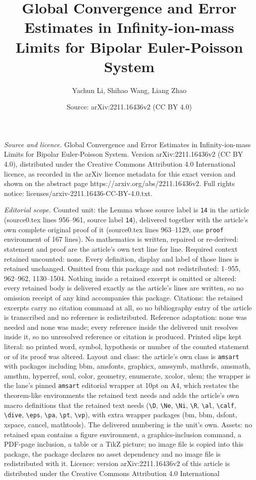 \documentclass[10pt,a4paper]{amsart}
\title[Global Convergence and Error Estimates in Infinity-ion-mass ]{Global Convergence and Error Estimates in Infinity-ion-mass Limits for Bipolar Euler-Poisson System}
\author{Yachun Li, Shihao Wang, Liang Zhao}
\date{Source: arXiv:2211.16436v2 (CC BY 4.0)}
\begin{document}
\maketitle

\noindent\emph{Source and licence.} Global Convergence and Error Estimates in Infinity-ion-mass Limits for Bipolar Euler-Poisson System. Version arXiv:2211.16436v2 (CC BY 4.0), distributed under the Creative Commons Attribution 4.0 International licence, as recorded in the arXiv licence metadata for this exact version and shown on the abstract page https://arxiv.org/abs/2211.16436v2. Full rights notice: licenses/arxiv-2211.16436-CC-BY-4.0.txt.\par\smallskip

\noindent\textit{Editorial scope.} Counted unit: the Lemma whose source label is \texttt{14} in the article (source0.tex lines 956--961, source label \texttt{14}), delivered together with the article's own complete original proof of it (source0.tex lines 963--1129, one \texttt{proof} environment of 167 lines). No mathematics is written, repaired or re-derived: statement and proof are the article's own text line for line. Required context retained uncounted: none. Every definition, display and label of those lines is retained unchanged. Omitted from this package and not redistributed: 1--955, 962--962, 1130--1504. Nothing inside a retained excerpt is omitted or altered: every retained body is delivered exactly as the article's lines are written, so no omission receipt of any kind accompanies this package. Citations: the retained excerpts carry no citation command at all, so no bibliography entry of the article is transcribed and no reference is redistributed. Reference adaptation: none was needed and none was made; every reference inside the delivered unit resolves inside it, so no unresolved reference or citation is produced. Printed slips kept literal: no printed word, symbol, hypothesis or number of the counted statement or of its proof was altered. Layout and class: the article's own class is \texttt{amsart} with packages including bbm, amsfonts, graphicx, amssymb, mathrsfs, amsmath, amsthm, hyperref, soul, color, geometry, enumerate, xcolor, ulem; the wrapper is the lane's pinned \texttt{amsart} editorial wrapper at 10pt on A4, which restates the theorem-like environments the retained text needs and adds the article's own macro definitions that the retained text needs (\texttt{\textbackslash D}, \texttt{\textbackslash Ne}, \texttt{\textbackslash Ni}, \texttt{\textbackslash R}, \texttt{\textbackslash al}, \texttt{\textbackslash calf}, \texttt{\textbackslash dive}, \texttt{\textbackslash eps}, \texttt{\textbackslash pa}, \texttt{\textbackslash pt}, \texttt{\textbackslash vp}), with extra wrapper packages (bm, bbm, dsfont, xspace, cancel, mathtools). The delivered numbering is the unit's own. Assets: no retained span contains a figure environment, a graphics-inclusion command, a PDF-page inclusion, a table or a TikZ picture; no image file is copied into this package, the package declares no asset dependency and no image file is redistributed with it. Licence: version arXiv:2211.16436v2 of this article is distributed under the Creative Commons Attribution 4.0 International 
\end{document}
